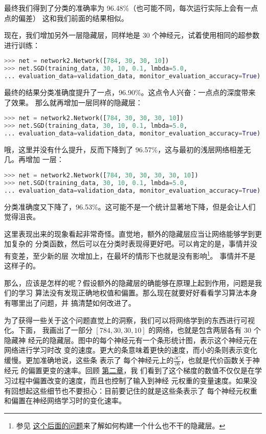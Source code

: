 最终我们得到了分类的准确率为 96.48\%（也可能不同，每次运行实际上会有一点点的偏差）
这和我们前面的结果相似。

现在，我们增加另外一层隐藏层，同样地是 30 个神经元，试着使用相同的超参数进行训练：
\begin{lstlisting}[language=Python]
>>> net = network2.Network([784, 30, 30, 10]) 
>>> net.SGD(training_data, 30, 10, 0.1, lmbda=5.0,  
... evaluation_data=validation_data, monitor_evaluation_accuracy=True) 
\end{lstlisting}

最终的结果分类准确度提升了一点，96.90\%。这点令人兴奋：一点点的深度带来了效果。
那么就再增加一层同样的隐藏层：
\begin{lstlisting}[language=Python]
>>> net = network2.Network([784, 30, 30, 30, 10]) 
>>> net.SGD(training_data, 30, 10, 0.1, lmbda=5.0,  
... evaluation_data=validation_data, monitor_evaluation_accuracy=True) 
\end{lstlisting}

哦，这里并没有什么提升，反而下降到了 96.57\%，这与最初的浅层网络相差无几。再增加
一层：
\begin{lstlisting}[language=Python]
>>> net = network2.Network([784, 30, 30, 30, 30, 10]) 
>>> net.SGD(training_data, 30, 10, 0.1, lmbda=5.0,  
... evaluation_data=validation_data, monitor_evaluation_accuracy=True) 
\end{lstlisting}

分类准确度又下降了，96.53\%。这可能不是一个统计显著地下降，但是会让人们觉得沮丧。
 
这里表现出来的现象看起非常奇怪。直觉地，额外的隐藏层应当让网络能够学到更加复杂的
分类函数，然后可以在分类时表现得更好吧。可以肯定的是，事情并没有变差，至少新的层
次增加上，在最坏的情形下也就是没有影响\footnote{参见%
\hyperref[identity_neuron]{这个后面的问题}来了解如何构建一个什么也不干的隐藏层。}。
事情并不是这样子的。
 
那么，应该是怎样的呢？假设额外的隐藏层的确能够在原理上起到作用，问题是我们的学习
算法没有发现正确地权值和偏置。那么现在就要好好看看学习算法本身有哪里出了问题，并
搞清楚如何改进了。
 
为了获得一些关于这个问题直觉上的洞察，我们可以将网络学到的东西进行可视化。下面，
我画出了一部分 $[784, 30, 30, 10]$ 的网络，也就是包含两层各有 $30$ 个隐藏神
经元的隐藏层。图中的每个神经元有一个条形统计图，表示这个神经元在网络进行学习时改
变的速度。更大的条意味着更快的速度，而小的条则表示变化缓慢。更加准确地说，这些条
表示了 每个神经元上的$\frac{\partial C}{\partial b}$，也就是代价函数关于神经元
的偏置更变的速率。回顾%
\hyperref[sec:the_four_fundamental_equations_behind_backpropagation]{第二章}，我
们看到了这个梯度的数值不仅仅是在学习过程中偏置改变的速度，而且也控制了输入到神经
元权重的变量速度。如果没有回想起这些细节也不要担心：目前要记住的就是这些条表示了
每个神经元权重和偏置在神经网络学习时的变化速率。
 
